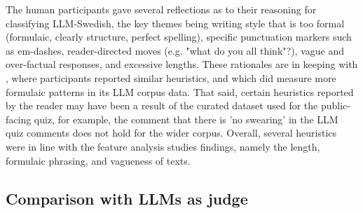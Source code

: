 \documentclass[thesis]{cluu}
\begin{document}
The human participants gave several reflections as to their reasoning for classifying LLM-Swedish, the key themes being writing style that is too formal (formulaic, clearly structure, perfect spelling), specific punctuation markers such as em-dashes, reader-directed moves (e.g. "what do you all think"?), vague and over-factual responses, and excessive lengths. These rationales are in keeping with \textcite{dugan2024detecting}, where participants reported similar heuristics,  and \cite{munoz-ortiz2024contrasting} which did measure more formulaic patterns in its LLM corpus data. That said, certain heuristics reported by the reader may have been a result of the curated dataset used for the public-facing quiz, for example, the comment that there is 'no swearing' in the LLM quiz comments does not hold for the wider corpus. Overall, several heuristics were in line with the feature analysis studies findings, namely the length, formulaic phrasing, and vagueness of texts.

\subsection{Comparison with LLMs as judge}
\end{document}
